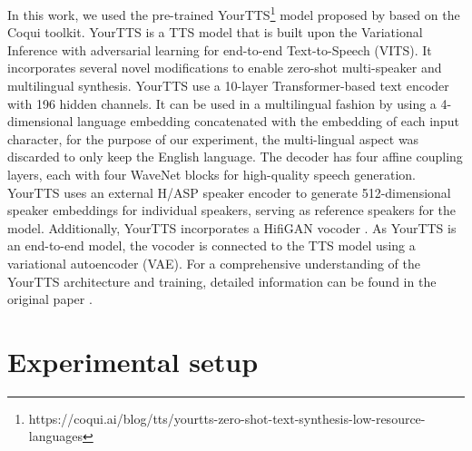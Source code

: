 In this work, we used the pre-trained YourTTS\footnote{https://coqui.ai/blog/tts/yourtts-zero-shot-text-synthesis-low-resource-languages} model proposed by \cite{casanova2022yourtts} based on the  Coqui toolkit. YourTTS is a TTS model that is built upon the Variational Inference with adversarial learning for end-to-end Text-to-Speech (VITS). It incorporates several novel modifications to enable zero-shot multi-speaker and multilingual synthesis. 
YourTTS use a 10-layer Transformer-based text encoder with 196 hidden channels. It can be used in a multilingual fashion by using a 4-dimensional language embedding concatenated with the embedding of each input character, for the purpose of our experiment, the multi-lingual aspect was discarded to only keep the English language. The decoder has four affine coupling layers, each with four WaveNet blocks for high-quality speech generation. YourTTS uses an external H/ASP speaker encoder to generate 512-dimensional speaker embeddings for individual speakers, serving as reference speakers for the model. Additionally, YourTTS incorporates a HifiGAN vocoder \cite{kong2020hifi}. As YourTTS is an end-to-end model, the vocoder is connected to the TTS model using a variational autoencoder (VAE). For a comprehensive understanding of the YourTTS architecture and training, detailed information can be found in the original paper \cite{casanova2022yourtts}.


\section{Experimental setup}
\label{section:methods}

